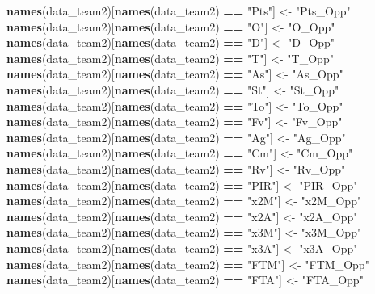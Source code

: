 \documentclass[
]{article}
\newenvironment{Shaded}{\begin{snugshade}}{\end{snugshade}}
\newcommand{\KeywordTok}[1]{\textcolor[rgb]{0.13,0.29,0.53}{\textbf{#1}}}
\newcommand{\NormalTok}[1]{#1}
\newcommand{\OperatorTok}[1]{\textcolor[rgb]{0.81,0.36,0.00}{\textbf{#1}}}
\newcommand{\StringTok}[1]{\textcolor[rgb]{0.31,0.60,0.02}{#1}}
\begin{document}
\begin{Shaded}
\begin{Highlighting}[]
\KeywordTok{names}\NormalTok{(data_team2)[}\KeywordTok{names}\NormalTok{(data_team2) }\OperatorTok{==}\StringTok{ "Pts"}\NormalTok{] <-}\StringTok{ "Pts_Opp"}
\KeywordTok{names}\NormalTok{(data_team2)[}\KeywordTok{names}\NormalTok{(data_team2) }\OperatorTok{==}\StringTok{ "O"}\NormalTok{] <-}\StringTok{ "O_Opp"}
\KeywordTok{names}\NormalTok{(data_team2)[}\KeywordTok{names}\NormalTok{(data_team2) }\OperatorTok{==}\StringTok{ "D"}\NormalTok{] <-}\StringTok{ "D_Opp"}
\KeywordTok{names}\NormalTok{(data_team2)[}\KeywordTok{names}\NormalTok{(data_team2) }\OperatorTok{==}\StringTok{ "T"}\NormalTok{] <-}\StringTok{ "T_Opp"}
\KeywordTok{names}\NormalTok{(data_team2)[}\KeywordTok{names}\NormalTok{(data_team2) }\OperatorTok{==}\StringTok{ "As"}\NormalTok{] <-}\StringTok{ "As_Opp"}
\KeywordTok{names}\NormalTok{(data_team2)[}\KeywordTok{names}\NormalTok{(data_team2) }\OperatorTok{==}\StringTok{ "St"}\NormalTok{] <-}\StringTok{ "St_Opp"}
\KeywordTok{names}\NormalTok{(data_team2)[}\KeywordTok{names}\NormalTok{(data_team2) }\OperatorTok{==}\StringTok{ "To"}\NormalTok{] <-}\StringTok{ "To_Opp"}
\KeywordTok{names}\NormalTok{(data_team2)[}\KeywordTok{names}\NormalTok{(data_team2) }\OperatorTok{==}\StringTok{ "Fv"}\NormalTok{] <-}\StringTok{ "Fv_Opp"}
\KeywordTok{names}\NormalTok{(data_team2)[}\KeywordTok{names}\NormalTok{(data_team2) }\OperatorTok{==}\StringTok{ "Ag"}\NormalTok{] <-}\StringTok{ "Ag_Opp"}
\KeywordTok{names}\NormalTok{(data_team2)[}\KeywordTok{names}\NormalTok{(data_team2) }\OperatorTok{==}\StringTok{ "Cm"}\NormalTok{] <-}\StringTok{ "Cm_Opp"}
\KeywordTok{names}\NormalTok{(data_team2)[}\KeywordTok{names}\NormalTok{(data_team2) }\OperatorTok{==}\StringTok{ "Rv"}\NormalTok{] <-}\StringTok{ "Rv_Opp"}
\KeywordTok{names}\NormalTok{(data_team2)[}\KeywordTok{names}\NormalTok{(data_team2) }\OperatorTok{==}\StringTok{ "PIR"}\NormalTok{] <-}\StringTok{ "PIR_Opp"}
\KeywordTok{names}\NormalTok{(data_team2)[}\KeywordTok{names}\NormalTok{(data_team2) }\OperatorTok{==}\StringTok{ "x2M"}\NormalTok{] <-}\StringTok{ "x2M_Opp"}
\KeywordTok{names}\NormalTok{(data_team2)[}\KeywordTok{names}\NormalTok{(data_team2) }\OperatorTok{==}\StringTok{ "x2A"}\NormalTok{] <-}\StringTok{ "x2A_Opp"}
\KeywordTok{names}\NormalTok{(data_team2)[}\KeywordTok{names}\NormalTok{(data_team2) }\OperatorTok{==}\StringTok{ "x3M"}\NormalTok{] <-}\StringTok{ "x3M_Opp"}
\KeywordTok{names}\NormalTok{(data_team2)[}\KeywordTok{names}\NormalTok{(data_team2) }\OperatorTok{==}\StringTok{ "x3A"}\NormalTok{] <-}\StringTok{ "x3A_Opp"}
\KeywordTok{names}\NormalTok{(data_team2)[}\KeywordTok{names}\NormalTok{(data_team2) }\OperatorTok{==}\StringTok{ "FTM"}\NormalTok{] <-}\StringTok{ "FTM_Opp"}
\KeywordTok{names}\NormalTok{(data_team2)[}\KeywordTok{names}\NormalTok{(data_team2) }\OperatorTok{==}\StringTok{ "FTA"}\NormalTok{] <-}\StringTok{ "FTA_Opp"}


\end{Highlighting}
\end{Shaded}
\end{document}

